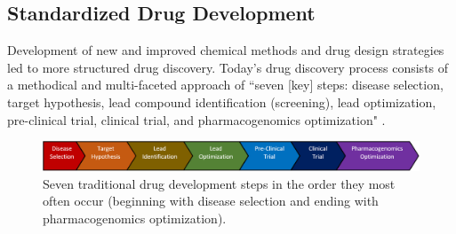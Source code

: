 \documentclass{IEEEtran}
\begin{document}
		\subsection{Standardized Drug Development} \label{standardized}
		Development of new and improved chemical methods and drug design strategies led to more structured drug discovery.  Today's drug discovery process consists of a methodical and multi-faceted approach of ``seven [key] steps: disease selection, target hypothesis, lead compound identification (screening), lead optimization, pre-clinical trial, clinical trial, and pharmacogenomics optimization" \cite{xu}. 
		\begin{figure}
			\centering
			\includegraphics[width=\textwidth, scale=0.5]{Fig1}
			\caption{\footnotesize Seven traditional drug development steps in the order they most often occur (beginning with disease selection and ending with pharmacogenomics optimization).}
			\label{fig1}
		\end{figure}
\end{document}
